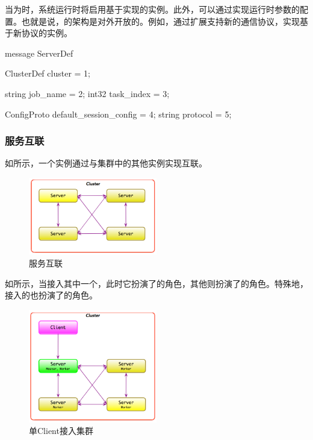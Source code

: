 \begin{content}
当为时，系统运行时将启用基于实现的实例。此外，可以通过实现运行时参数的配置。也就是说，\tf{}的架构是对外开放的。例如，通过扩展支持新的通信协议，实现基于新协议的实例。

\begin{leftbar}
\begin{python}
message ServerDef {
  ClusterDef cluster = 1;
  
  string job_name = 2;
  int32 task_index = 3;

  ConfigProto default_session_config = 4;
  string protocol = 5;
}
\end{python}
\end{leftbar}

\subsubsection{服务互联}

如所示，一个实例通过与集群中的其他实例实现互联。

\begin{figure}[H]
\centering
\includegraphics[width=0.5\textwidth]{figures/cc-server-interact.png}
\caption{服务互联}
 \label{fig:cc-server-interact}
\end{figure}

如所示，当接入其中一个，此时它扮演了的角色，其他则扮演了的角色。特殊地，接入的也扮演了的角色。

\begin{figure}[H]
\centering
\includegraphics[width=0.5\textwidth]{figures/cc-server-interact-1.png}
\caption{单Client接入集群}
 \label{fig:cc-server-interact-1}
\end{figure}


\end{content}
